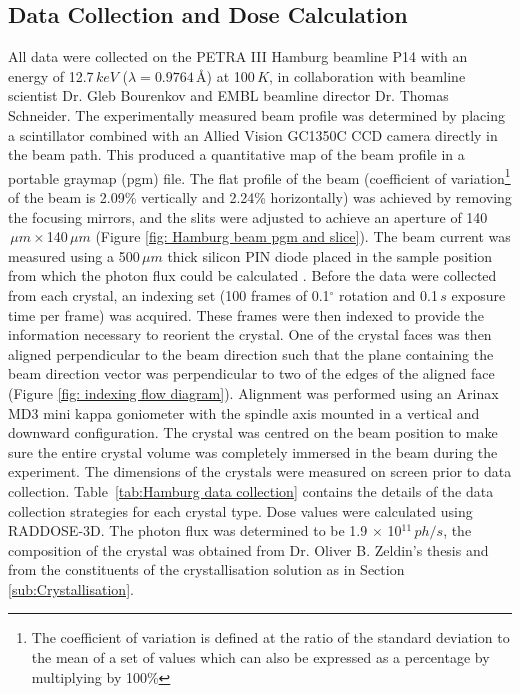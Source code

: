 \subsection{Data Collection and Dose Calculation}
\label{sub:Data Collection and Dose Calculation}
All data were collected on the PETRA III Hamburg beamline P14 with an energy of 12.7$\,keV$ ($\lambda = \text{0.9764}\,$\AA) at 100$\,K$, in collaboration with beamline scientist Dr. Gleb Bourenkov and EMBL beamline director Dr. Thomas Schneider.
The experimentally measured beam profile was determined by placing a scintillator combined with an Allied Vision GC1350C CCD camera directly in the beam path.
This produced a quantitative map of the beam profile in a portable graymap (pgm) file.
The flat profile of the beam (coefficient of variation\footnote{The coefficient of variation is defined at the ratio of the standard deviation to the mean of a set of values which can also be expressed as a percentage by multiplying by 100\%} of the beam is 2.09\% vertically and  2.24\% horizontally) was achieved by removing the focusing mirrors, and the slits were adjusted to achieve an aperture of 140$\,\mu m \times $140$\,\mu m$ (Figure \ref{fig: Hamburg beam pgm and slice}).
The beam current was measured using a 500$\,\mu m$ thick silicon PIN diode placed in the sample position from which the photon flux could be calculated \cite{owen2009}.
Before the data were collected from each crystal, an indexing set (100 frames of 0.1$^{\circ}$ rotation and 0.1$\,s$ exposure time per frame) was acquired.
These frames were then indexed to provide the information necessary to reorient the crystal.
One of the crystal faces was then aligned perpendicular to the beam direction such that the plane containing the beam direction vector was perpendicular to two of the edges of the aligned face (Figure \ref{fig: indexing flow diagram}).
Alignment was performed using an Arinax MD3 mini kappa goniometer with the spindle axis mounted in a vertical and downward configuration.
The crystal was centred on the beam position to make sure the entire crystal volume was completely immersed in the beam during the experiment.
The dimensions of the crystals were measured on screen prior to data collection.
Table~\ref{tab:Hamburg data collection} contains the details of the data collection strategies for each crystal type.
Dose values were calculated using RADDOSE-3D.
The photon flux was determined to be 1.9 $\times$ 10$^{\text{11}}\,ph/s$, the composition of the crystal was obtained from Dr. Oliver B. Zeldin's thesis \cite{zeldin2013thesis} and from the constituents of the crystallisation solution as in Section \ref{sub:Crystallisation}.
